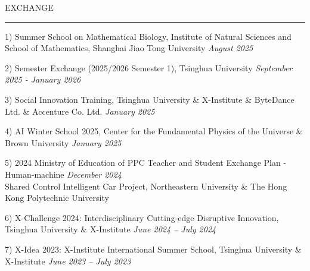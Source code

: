 \documentclass{resume} %
\renewenvironment{rSection}[1]{
\sectionskip
\textcolor{TsinghuaPurple}{\MakeUppercase{#1}}
\sectionlineskip
\hrule
\begin{list}{}{
\setlength{\leftmargin}{0em}
}
\item[]
}{
\end{list}
}
\begin{document}
\begin{rSection}{Exchange}
1) Summer School on Mathematical Biology, Institute of Natural Sciences and School of Mathematics, Shanghai Jiao Tong University \hfill \textit{August 2025}

2)	Semester Exchange (2025/2026 Semester 1), Tsinghua University	\hfill \textit{September 2025 - January 2026}

3)	Social Innovation Training, Tsinghua University \& X-Institute \& ByteDance Ltd. \& Accenture Co. Ltd.	 \hfill \textit{January 2025}

4)	AI Winter School 2025, Center for the Fundamental Physics of the Universe \& Brown University	 \hfill \textit{January 2025}

5)	2024 Ministry of Education of PPC Teacher and Student Exchange Plan - Human-machine \hfill \textit{December 2024}\\ Shared Control Intelligent Car  Project, Northeastern University \& The Hong Kong Polytechnic University

6)	X-Challenge 2024: Interdisciplinary Cutting-edge Disruptive Innovation, Tsinghua University \& X-Institute \hfill \textit{June 2024 -- July 2024}

7)	X-Idea 2023: X-Institute International Summer School, Tsinghua University \& X-Institute \hfill \textit{June 2023 -- July 2023}
\end{rSection}
\end{document}
